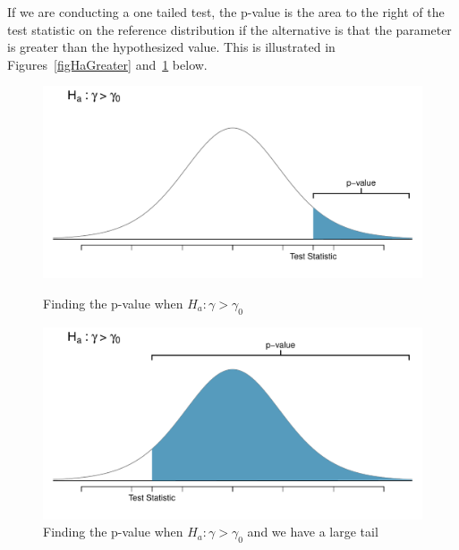 If we are conducting a one tailed test, the p-value is the area to the right of the test statistic
on the reference distribution if the alternative is that the parameter is greater than the hypothesized value.
This is illustrated in Figures~\ref{figHaGreater} and~\ref{figHaGreaterLargeTail} below.

\begin{figure}[H]
\begin{minipage}[b]{0.5\linewidth}
\centering
\includegraphics[width=\textwidth]{05-5/figures/pvalAlternaterGreaterThan/pvalAlternateGreaterThanSmallTail.pdf}
\captionsetup{width=0.9\textwidth}
\caption{Finding the p-value when $H_a : \gamma > \gamma_0$ }
\label{figHaGreater}
\end{minipage}
\quad
\begin{minipage}[b]{0.5\linewidth}
\centering
\includegraphics[width=\textwidth]{05-5/figures/pvalAlternaterGreaterThan/pvalAlternateGreaterThanLargeTail.pdf}
\captionsetup{width=0.9\textwidth}
\caption{Finding the p-value when $H_a : \gamma > \gamma_0$  and we have a large tail}
\label{figHaGreaterLargeTail}
\end{minipage}
\end{figure}

